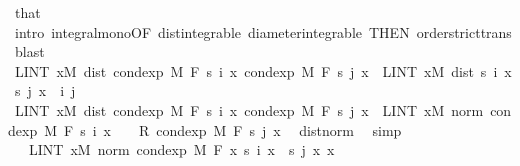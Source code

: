 \begin{isabellebody}
\ that\ {\isacharasterisk}{\kern0pt}\ \isamarkupfalse%
\ {\isacharparenleft}{\kern0pt}intro\ integral{\isacharunderscore}{\kern0pt}mono{\isacharbrackleft}{\kern0pt}OF\ dist{\isacharunderscore}{\kern0pt}integrable\ diameter{\isacharunderscore}{\kern0pt}integrable{\isacharcomma}{\kern0pt}\ THEN\ order{\isachardot}{\kern0pt}strict{\isacharunderscore}{\kern0pt}trans{}{\isacharbrackright}{\kern0pt}{\isacharcomma}{\kern0pt}\ blast{\isacharplus}{\kern0pt}{\isacharparenright}{\kern0pt}\isanewline
\ \ \ \ \isamarkupfalse%
\ \isamarkupfalse%
\ {\isachardoublequoteopen}LINT\ x{\isacharbar}{\kern0pt}M{\isachardot}{\kern0pt}\ dist\ {\isacharparenleft}{\kern0pt}cond{\isacharunderscore}{\kern0pt}exp\ M\ F\ {\isacharparenleft}{\kern0pt}s\ i{\isacharparenright}{\kern0pt}\ x{\isacharparenright}{\kern0pt}\ {\isacharparenleft}{\kern0pt}cond{\isacharunderscore}{\kern0pt}exp\ M\ F\ {\isacharparenleft}{\kern0pt}s\ j{\isacharparenright}{\kern0pt}\ x{\isacharparenright}{\kern0pt}\ {\isasymle}\ LINT\ x{\isacharbar}{\kern0pt}M{\isachardot}{\kern0pt}\ dist\ {\isacharparenleft}{\kern0pt}s\ i\ x{\isacharparenright}{\kern0pt}\ {\isacharparenleft}{\kern0pt}s\ j\ x{\isacharparenright}{\kern0pt}{\isachardoublequoteclose}\ \ i\ j\isanewline
\ \ \ \ \isamarkupfalse%
{\isacharminus}{\kern0pt}\isanewline
\ \ \ \ \ \ \isamarkupfalse%
\ {\isachardoublequoteopen}LINT\ x{\isacharbar}{\kern0pt}M{\isachardot}{\kern0pt}\ dist\ {\isacharparenleft}{\kern0pt}cond{\isacharunderscore}{\kern0pt}exp\ M\ F\ {\isacharparenleft}{\kern0pt}s\ i{\isacharparenright}{\kern0pt}\ x{\isacharparenright}{\kern0pt}\ {\isacharparenleft}{\kern0pt}cond{\isacharunderscore}{\kern0pt}exp\ M\ F\ {\isacharparenleft}{\kern0pt}s\ j{\isacharparenright}{\kern0pt}\ x{\isacharparenright}{\kern0pt}\ {\isacharequal}{\kern0pt}\ LINT\ x{\isacharbar}{\kern0pt}M{\isachardot}{\kern0pt}\ norm\ {\isacharparenleft}{\kern0pt}cond{\isacharunderscore}{\kern0pt}exp\ M\ F\ {\isacharparenleft}{\kern0pt}s\ i{\isacharparenright}{\kern0pt}\ x\ {\isacharplus}{\kern0pt}\ {\isacharminus}{\kern0pt}\ {}\ {\isacharasterisk}{\kern0pt}\isactrlsub R\ cond{\isacharunderscore}{\kern0pt}exp\ M\ F\ {\isacharparenleft}{\kern0pt}s\ j{\isacharparenright}{\kern0pt}\ x{\isacharparenright}{\kern0pt}{\isachardoublequoteclose}\ \isamarkupfalse%
\ dist{\isacharunderscore}{\kern0pt}norm\ \isamarkupfalse%
\ simp\isanewline
\ \ \ \ \ \ \isamarkupfalse%
\ \isamarkupfalse%
\ {\isachardoublequoteopen}{\isachardot}{\kern0pt}{\isachardot}{\kern0pt}{\isachardot}{\kern0pt}\ {\isacharequal}{\kern0pt}\ LINT\ x{\isacharbar}{\kern0pt}M{\isachardot}{\kern0pt}\ norm\ {\isacharparenleft}{\kern0pt}cond{\isacharunderscore}{\kern0pt}exp\ M\ F\ {\isacharparenleft}{\kern0pt}{\isasymlambda}x{\isachardot}{\kern0pt}\ s\ i\ x\ {\isacharminus}{\kern0pt}\ s\ j\ x{\isacharparenright}{\kern0pt}\ x{\isacharparenright}{\kern0pt}{\isachardoublequoteclose}\ \isamarkupfalse%

\end{isabellebody}
